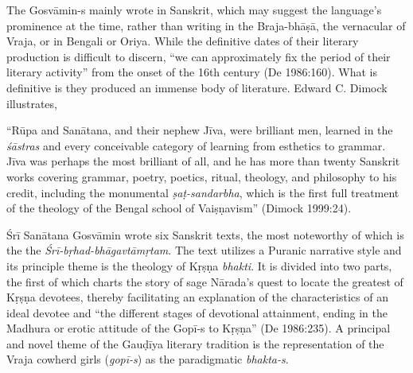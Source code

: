 The Gosvāmin-s mainly wrote in Sanskrit, which may suggest the language’s prominence at the time, rather than writing in the Braja-bhāṣā, the vernacular of Vraja, or in Bengali or Oriya. While the definitive dates of their literary production is difficult to discern, “we can approximately fix the period of their literary activity” from the onset of the 16th century (De 1986:160). What is definitive is they produced an immense body of literature. Edward C. Dimock illustrates, 
\begin{myquote}
\eleven
“Rūpa and Sanātana, and their nephew Jīva, were brilliant men, learned in the {\sl śāstras} and every conceivable category of learning from esthetics to grammar. Jīva was perhaps the most brilliant of all, and he has more than twenty Sanskrit works covering grammar, poetry, poetics, ritual, theology, and philosophy to his credit, including the monumental {\sl ṣaṭ-sandarbha}, which is the first full treatment of the theology of the Bengal school of Vaiṣṇavism” \hfill (Dimock 1999:24). 
\end{myquote}

Śrī Sanātana Gosvāmin wrote six Sanskrit texts, the most noteworthy of which is the the {\sl Śrī-bṛhad-bhāgavtāmṛtam}. The text utilizes a Puranic narrative style and its principle theme is the theology of Kṛṣṇa {\sl bhakti}. It is divided into two parts, the first of which charts the story of sage Nārada’s quest to locate the greatest of Kṛṣṇa devotees, thereby facilitating an explanation of the characteristics of an ideal devotee and “the different stages of devotional attainment, ending in the Madhura or erotic attitude of the Gopī-s to Kṛṣṇa” (De 1986:235). A principal and novel theme of the Gauḍīya literary tradition is the representation of the Vraja cowherd girls ({\sl gopī-s}) as the paradigmatic {\sl bhakta-s}.


